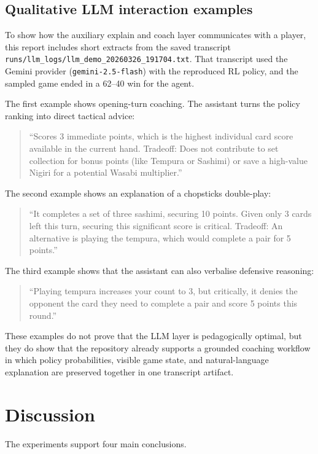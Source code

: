\documentclass[10pt]{article}
\begin{document}
\subsection{Qualitative LLM interaction examples}

To show how the auxiliary explain and coach layer communicates with a player, this report includes short extracts from the saved transcript \texttt{runs/llm\_logs/llm\_demo\_20260326\_191704.txt}. That transcript used the Gemini provider (\texttt{gemini-2.5-flash}) with the reproduced RL policy, and the sampled game ended in a 62--40 win for the agent.

The first example shows opening-turn coaching. The assistant turns the policy ranking into direct tactical advice:
\begin{quote}\small
``Scores 3 immediate points, which is the highest individual card score available in the current hand. Tradeoff: Does not contribute to set collection for bonus points (like Tempura or Sashimi) or save a high-value Nigiri for a potential Wasabi multiplier.''
\end{quote}

The second example shows an explanation of a chopsticks double-play:
\begin{quote}\small
``It completes a set of three sashimi, securing 10 points. Given only 3 cards left this turn, securing this significant score is critical. Tradeoff: An alternative is playing the tempura, which would complete a pair for 5 points.''
\end{quote}

The third example shows that the assistant can also verbalise defensive reasoning:
\begin{quote}\small
``Playing tempura increases your count to 3, but critically, it denies the opponent the card they need to complete a pair and score 5 points this round.''
\end{quote}

These examples do not prove that the LLM layer is pedagogically optimal, but they do show that the repository already supports a grounded coaching workflow in which policy probabilities, visible game state, and natural-language explanation are preserved together in one transcript artifact.

\section{Discussion}

The experiments support four main conclusions.
\end{document}
